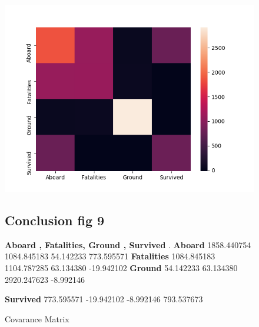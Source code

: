 \documentclass{article}
\begin{document}
\begin{figure}[!hbt]
\includegraphics[width=1.3\linewidth,height=0.500\textheight]{CovMatrix.png}
\caption{Covarance Matrix}
\label{fig9:}
\subsection{Conclusion fig 9} 
\tableofcontents 
\textbf{Aboard , Fatalities,   Ground   , Survived} .
\newline
\textbf{Aboard}      1858.440754  1084.845183    54.142233  773.595571
\newline
\textbf{Fatalities}  1084.845183  1104.787285    63.134380  -19.942102
\newline
\textbf{Ground}       54.142233    63.134380  2920.247623   -8.992146

\textbf{Survived}     773.595571   -19.942102    -8.992146  793.537673
\end{figure}
\end{document}
